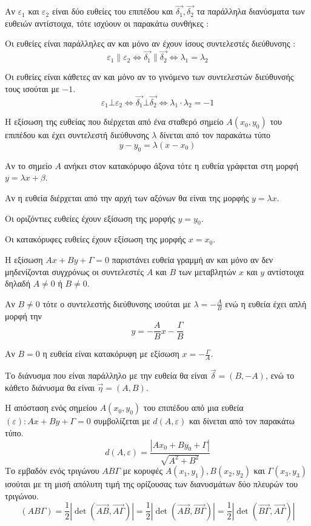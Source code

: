 \documentclass[twoside,nofonts,internet,shmeiwseis]{thewria}
\begin{document}
Αν $ \varepsilon_1 $ και $ \varepsilon_2 $ είναι δύο ευθείες του επιπέδου και $ \vec{\delta_1},\vec{\delta_2} $ τα παράλληλα διανύσματα των ευθειών αντίστοιχα, τότε ισχύουν οι παρακάτω συνθήκες :
\begin{rlist}
\item Οι ευθείες είναι παράλληλες αν και μόνο αν έχουν ίσους συντελεστές διεύθυνσης :  \[ \varepsilon_1\parallel\varepsilon_2\Leftrightarrow\vec{\delta_1}\parallel\vec{\delta_2}\Leftrightarrow\lambda_1=\lambda_2 \]
\item Οι ευθείες είναι κάθετες αν και μόνο αν το γινόμενο των συντελεστών διεύθυνσής τους ισούται με $ -1 $.
\[ \varepsilon_1\bot\varepsilon_2\Leftrightarrow\vec{\delta_1}\bot\vec{\delta_2}\Leftrightarrow\lambda_1\cdot\lambda_2=-1 \]
\end{rlist}
Η εξίσωση της ευθείας που διέρχεται από ένα σταθερό σημείο $ A(x_0,y_0) $ του επιπέδου και έχει συντελεστή διεύθυνσης $ \lambda $ δίνεται από τον παρακάτω τύπο
\[ y-y_0=\lambda(x-x_0) \]
\begin{rlist}
\item Αν το σημείο $ A $ ανήκει στον κατακόρυφο άξονα τότε η ευθεία γράφεται στη μορφή $ y=\lambda x+\beta $.
\item Αν η ευθεία διέρχεται από την αρχή των αξόνων θα είναι της μορφής $ y=\lambda x $.
\item Οι οριζόντιες ευθείες έχουν εξίσωση της μορφής $ y=y_0 $.
\item Οι κατακόρυφες ευθείες έχουν εξίσωση της μορφής $ x=x_0 $.
\end{rlist}
\thewrhmata
{}
Η εξίσωση $ Ax+By+\varGamma=0 $ παριστάνει ευθεία γραμμή αν και μόνο αν δεν μηδενίζονται συγχρόνως οι συντελεστές $ A $ και $ B $ των μεταβλητών $ x $ και $ y $ αντίστοιχα δηλαδή $ A\neq0 $ ή $ B\neq0 $.
\begin{rlist}
\item Αν $ B\neq0 $ τότε ο συντελεστής διεύθυνσης ισούται με $ \lambda=-\frac{A}{B} $ ενώ η ευθεία έχει απλή μορφή την \[ y=-\frac{A}{B}x-\frac{\varGamma}{B} \]
\item Αν $ B=0 $ η ευθεία είναι κατακόρυφη με εξίσωση $ x=-\frac{\varGamma}{A} $.
\item Το διάνυσμα που είναι παράλληλο με την ευθεία θα είναι $ \vec{\delta}=(B,-A) $, ενώ το κάθετο διάνυσμα θα είναι $ \vec{\eta}=(A,B) $.
\end{rlist}
Η απόσταση ενός σημείου $ A(x_0,y_0) $ του επιπέδου από μια ευθεία $(\varepsilon) : Ax+By+\varGamma=0 $ συμβολίζεται με $ d(A,\varepsilon) $ και δίνεται από τον παρακάτω τύπο.
\[ d(A,\varepsilon)=\frac{|Ax_0+By_0+\varGamma|}{\sqrt{A^2+B^2}} \]
Το εμβαδόν ενός τριγώνου $ AB\varGamma $ με κορυφές $ A(x_1,y_1),B(x_2,y_2) $ και $ \varGamma(x_3,y_3) $ ισούται με τη μισή απόλυτη τιμή της ορίζουσας των διανυσμάτων δύο πλευρών του τριγώνου.
\[ (AB\varGamma)=\frac{1}{2}\left|\det{(\overrightarrow{AB},\overrightarrow{A\varGamma})} \right|=\frac{1}{2}\left|\det{(\overrightarrow{AB},\overrightarrow{B\varGamma})} \right|=\frac{1}{2}\left|\det{(\overrightarrow{B\varGamma},\overrightarrow{A\varGamma})} \right| \]
\newpage
\noindent
\end{document}
